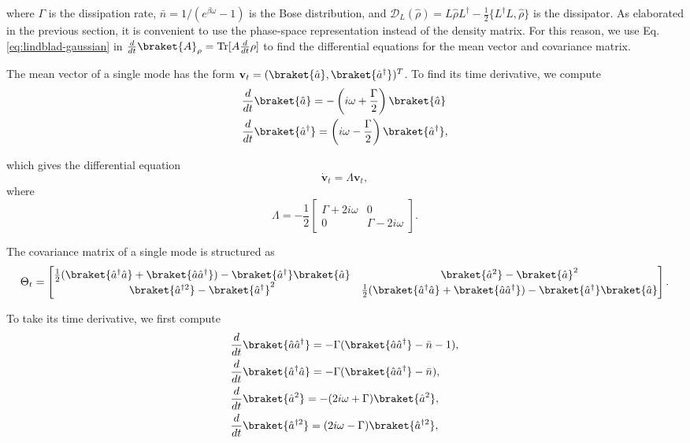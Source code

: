 \noindent where $\Gamma$ is the dissipation rate, $\bar{n} = 1/(e^{\beta \omega} - 1)$ is the Bose distribution, and $\mathcal{D}_L (\hat{\rho}) = L \hat{\rho} L^\dagger - \frac{1}{2}\{L^\dagger L, \hat{\rho} \}$ is the dissipator. As elaborated in the previous section, it is convenient to use the phase-space representation instead of the density matrix. For this reason, we use Eq. \eqref{eq:lindblad-gaussian} in $\frac{d}{dt} \braket{A}_\rho = \text{Tr}[A \frac{d}{dt}\rho]$ to find the differential equations for the mean vector and covariance matrix.

The mean vector of a single mode has the form $\mathbf{v}_t = (\braket{\hat{a}}, \braket{\hat{a}^\dagger})^T$. To find its time derivative, we compute
\begin{align}
    &\frac{d}{dt}\braket{\hat{a}} = -\left( i\omega + \frac{\Gamma}{2} \right) \braket{\hat{a}}\\
    &\frac{d}{dt}\braket{\hat{a}^\dagger} = \left( i\omega - \frac{\Gamma}{2} \right) \braket{\hat{a}^\dagger},
\end{align}

\noindent which gives the differential equation 
\begin{equation}
    \dot{\mathbf{v}}_t = \Lambda \mathbf{v}_t,
    \label{eq:dt-mean-vector}
\end{equation}
\noindent where
\begin{equation}
    \Lambda = -\frac{1}{2}
    \begin{bmatrix}
        \Gamma + 2i\omega & 0\\
        0 & \Gamma - 2i\omega
    \end{bmatrix}.
\end{equation}

\noindent The covariance matrix of a single mode is structured as
\begin{equation}
    \Theta_t =
    \begin{bmatrix}
        \frac{1}{2}(\braket{\hat{a}^\dagger \hat{a}} + \braket{\hat{a} \hat{a}^\dagger}) - \braket{\hat{a}^\dagger} \braket{\hat{a}} & \braket{\hat{a}^2} - \braket{\hat{a}}^2\\
        \braket{\hat{a}^{\dagger 2}} - \braket{\hat{a}^\dagger}^2 & \frac{1}{2}(\braket{\hat{a}^\dagger \hat{a}} + \braket{\hat{a} \hat{a}^\dagger}) - \braket{\hat{a}^\dagger} \braket{\hat{a}}
    \end{bmatrix}.
\end{equation}

\noindent To take its time derivative, we first compute
\begin{align}
    &\frac{d}{dt}\braket{\hat{a} \hat{a}^\dagger} = -\Gamma (\braket{\hat{a}\hat{a}^\dagger} - \bar{n} - 1),\\
    &\frac{d}{dt}\braket{\hat{a}^\dagger \hat{a}} = -\Gamma (\braket{\hat{a}\hat{a}^\dagger} - \bar{n}),\\
    &\frac{d}{dt}\braket{\hat{a}^2} = -(2i\omega + \Gamma)\braket{\hat{a}^2},\\
    &\frac{d}{dt}\braket{\hat{a}^{\dagger 2}} = (2i\omega - \Gamma)\braket{\hat{a}^{\dagger 2}},
\end{align}

